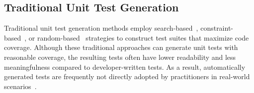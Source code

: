 

\subsection{Traditional Unit Test Generation}
Traditional unit test generation methods employ search-based~\citep{harman2009theoretical, fraser2011evosuite, lukasczyk2022pynguin}, constraint-based~\citep{xiao2013characteristic}, or random-based~\citep{pacheco2007feedback} strategies to construct test suites that maximize code coverage. 
Although these traditional approaches can generate unit tests with reasonable coverage, the resulting tests often have lower readability and less meaningfulness compared to developer-written tests. As a result, automatically generated tests are frequently not directly adopted by practitioners in real-world scenarios~\citep{almasi2017industrial, grano2019scented}.

